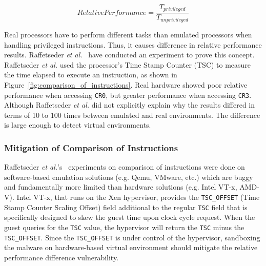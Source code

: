 \begin{equation*}
Relative Performance = \frac{T_{privileged}}{T_{unprivileged}}
\end{equation*}

Real processors have to perform different tasks than emulated processors when
handling privileged instructions. Thus, it causes difference in relative performance
results. Raffetseder {\em et al.}~\cite{raffetseder2007} have conducted an
experiment to prove this concept.  Raffetseder {\em et al.} used the
processor's Time Stamp Counter (TSC) to measure the time elapsed to execute an
instruction, as shown in Figure~\ref{fig:comparison_of_instructions}. Real
hardware showed poor relative performance when accessing {\tt CR0}, but greater
performance when accessing {\tt CR3}. Although Raffetseder {\em et al.} did not
explicitly explain why the results differed in terms
of 10 to 100 times between emulated and real environments. The difference is large enough to detect virtual
environments.

\subsubsection{Mitigation of Comparison of Instructions}
\label{sssec:mitigation_relative}

Raffetseder {\em et al.}'s~\cite{raffetseder2007} experiments on comparison of
instructions were done on software-based emulation solutions (e.g. Qemu, VMware,
etc.) which are buggy and fundamentally more limited than hardware solutions
(e.g. Intel VT-x, AMD-V). Intel VT-x, that runs on the Xen hypervisor, provides
the \texttt{TSC\_OFFSET} (Time Stamp Counter Scaling Offset) field additional to
the regular \texttt{TSC} field that is specifically designed to skew the guest
time upon clock cycle request. When the guest queries for the \texttt{TSC}
value, the hypervisor will return the \texttt{TSC} minus the
\texttt{TSC\_OFFSET}. Since the \texttt{TSC\_OFFSET} is under control of the
hypervisor, sandboxing the malware on hardware-based virtual environment should
mitigate the relative performance difference vulnerability.

